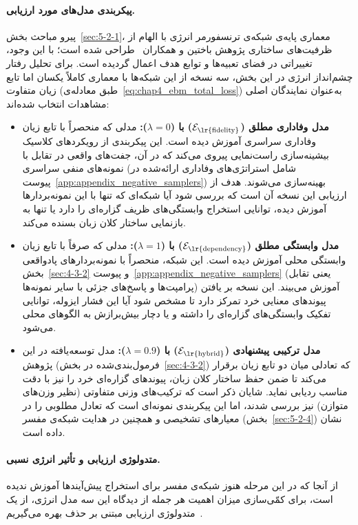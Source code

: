 \paragraph{پیکربندی مدل‌های مورد ارزیابی.}
پیرو مباحث بخش~\ref{sec:5-2-1}، معماری پایه‌ی شبکه‌ی ترنسفورمر انرژی با الهام از ظرفیت‌های ساختاری پژوهش باختین و همکاران~\cite{bakhtin2019realfake} طراحی شده است؛ با این وجود، تغییراتی در فضای تعبیه‌ها و توابع هدف اعمال گردیده است. برای تحلیل رفتار چشم‌انداز انرژی در این بخش، سه نسخه از این شبکه‌ها با معماری کاملاً یکسان اما تابع زیان متفاوت (طبق معادله‌ی~\ref{eq:chap4_ebm_total_loss}) به‌عنوان نمایندگان اصلی مشاهدات انتخاب شده‌اند:
\begin{itemize}
    \item \textbf{مدل وفاداری مطلق ($\mathcal{E}_{\text{\lr{fidelity}}}$) با ($\lambda=0$):} مدلی که منحصراً با تابع زیان وفاداری سراسری آموزش دیده است. این پیکربندی از رویکردهای کلاسیک بیشینه‌سازی راست‌نمایی پیروی می‌کند که در آن، جفت‌های واقعی در تقابل با نمونه‌های منفی سراسری (شامل استراتژی‌های وفاداری ارائه‌شده در پیوست~\ref{app:appendix_negative_samplers}) بهینه‌سازی می‌شوند. هدف از ارزیابی این نسخه آن است که بررسی شود آیا شبکه‌ای که تنها با این نمونه‌بردارها آموزش دیده، توانایی استخراج وابستگی‌های ظریف گزاره‌ای را دارد یا تنها به بازنمایی ساختار کلان زبان بسنده می‌کند.
    \item \textbf{مدل وابستگی مطلق ($\mathcal{E}_{\text{\lr{dependency}}}$) با ($\lambda=1$):} مدلی که صرفاً با تابع زیان وابستگی محلی آموزش دیده است. این شبکه، منحصراً با نمونه‌بردارهای پادواقعی بخش~\ref{sec:4-3-2} و پیوست~\ref{app:appendix_negative_samplers} (یعنی تقابل پرامپت‌ها و پاسخ‌های جزئی با سایر نمونه‌ها) آموزش می‌بیند. این نسخه بر یافتن پیوندهای معنایی خرد تمرکز دارد تا مشخص شود آیا این فشار ایزوله، توانایی تفکیک وابستگی‌های گزاره‌ای را داشته و یا دچار بیش‌برازش به الگوهای محلی می‌شود.
    \item \textbf{مدل ترکیبی پیشنهادی ($\mathcal{E}_{\text{\lr{hybrid}}}$) با ($\lambda=0.9$):} مدل توسعه‌یافته در این پژوهش (فرمول‌بندی‌شده در بخش~\ref{sec:4-3-2}) که تعادلی میان دو تابع زیان برقرار می‌کند تا ضمن حفظ ساختار کلان زبان، پیوندهای گزاره‌ای خرد را نیز با دقت مناسب ردیابی نماید. شایان ذکر است که ترکیب‌های وزنی متفاوتی (نظیر وزن‌های متوازن) نیز بررسی شدند، اما این پیکربندی نمونه‌ای است که تعادل مطلوبی را در معیارهای تشخیصی و همچنین در هدایت شبکه‌ی مفسر (بخش~\ref{sec:5-2-4}) نشان داده است.
\end{itemize}

\paragraph{متدولوژی ارزیابی و تأثیر انرژی نسبی.}
از آنجا که در این مرحله هنوز شبکه‌ی مفسر برای استخراج پیش‌آیندها آموزش ندیده است، برای کمّی‌سازی میزان اهمیت هر جمله از دیدگاه این سه مدل انرژی، از یک متدولوژی ارزیابی مبتنی بر حذف بهره می‌گیریم~\cite{li2017understanding}. 

